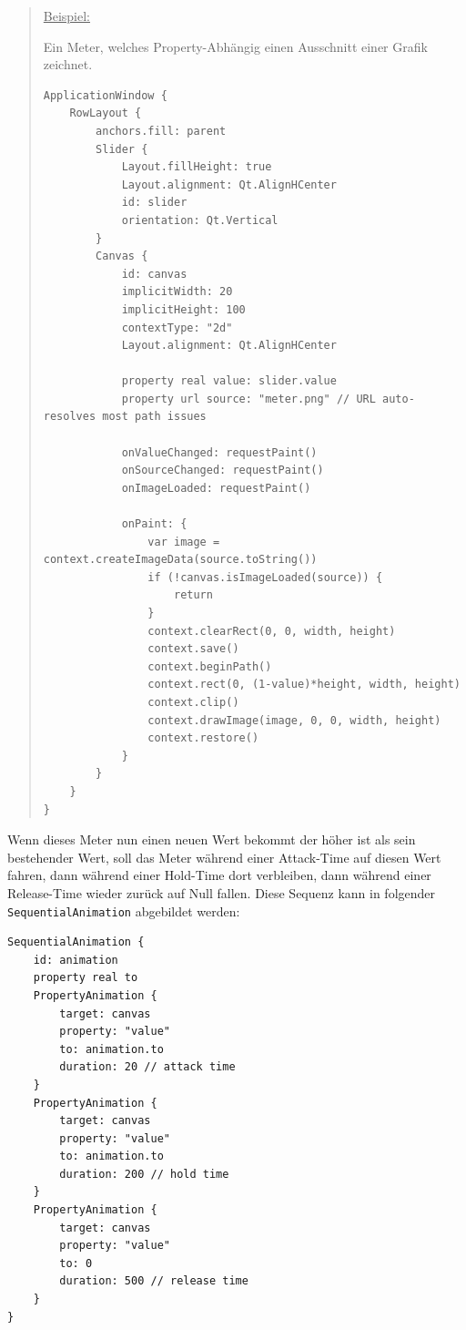 \documentclass[a4paper]{article}
\begin{document}
\begin{quote}
\uline{Beispiel:}

Ein Meter, welches Property-Abhängig einen Ausschnitt einer Grafik zeichnet.

\begin{verbatim}
ApplicationWindow {
    RowLayout {
        anchors.fill: parent
        Slider {
            Layout.fillHeight: true
            Layout.alignment: Qt.AlignHCenter
            id: slider
            orientation: Qt.Vertical
        }
        Canvas {
            id: canvas
            implicitWidth: 20
            implicitHeight: 100
            contextType: "2d"
            Layout.alignment: Qt.AlignHCenter

            property real value: slider.value
            property url source: "meter.png" // URL auto-resolves most path issues

            onValueChanged: requestPaint()
            onSourceChanged: requestPaint()
            onImageLoaded: requestPaint()

            onPaint: {
                var image = context.createImageData(source.toString())
                if (!canvas.isImageLoaded(source)) {
                    return
                }
                context.clearRect(0, 0, width, height)
                context.save()
                context.beginPath()
                context.rect(0, (1-value)*height, width, height)
                context.clip()
                context.drawImage(image, 0, 0, width, height)
                context.restore()
            }
        }
    }
}
\end{verbatim}
\end{quote}

Wenn dieses Meter nun einen neuen Wert bekommt der höher ist als sein bestehender Wert, soll das Meter während einer Attack-Time auf diesen Wert fahren, dann während einer Hold-Time dort verbleiben, dann während einer Release-Time wieder zurück auf Null fallen. Diese Sequenz kann in folgender \verb~SequentialAnimation~ abgebildet werden:

\begin{verbatim}
SequentialAnimation {
    id: animation
    property real to
    PropertyAnimation {
        target: canvas
        property: "value"
        to: animation.to
        duration: 20 // attack time
    }
    PropertyAnimation {
        target: canvas
        property: "value"
        to: animation.to
        duration: 200 // hold time
    }
    PropertyAnimation {
        target: canvas
        property: "value"
        to: 0
        duration: 500 // release time
    }
}
\end{verbatim}
\end{document}
